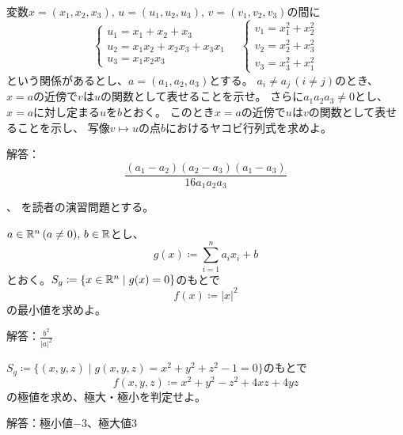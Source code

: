 \documentclass[report]{jlreq}
\begin{document}
\begin{problem}
    変数$x = (x_1, x_2, x_3),\, u = (u_1, u_2, u_3),\, v = (v_1, v_2, v_3)$の間に
    \begin{equation}
        \begin{cases}
            u_1 = x_1 + x_2 + x_3 \\
            u_2 = x_1 x_2 + x_2 x_3 + x_3 x_1 \\
            u_3 = x_1 x_2 x_3
        \end{cases}
        \quad
        \begin{cases}
            v_1 = x_1^2 + x_2^2 \\
            v_2 = x_2^2 + x_3^2 \\
            v_3 = x_3^2 + x_1^2
        \end{cases}
    \end{equation}
    という関係があるとし、$a = (a_1, a_2, a_3)$とする。
    $a_i \neq a_j\, (i \neq j)$のとき、
    $x = a$の近傍で$v$は$u$の関数として表せることを示せ。
    さらに$a_1 a_2 a_3 \neq 0$とし、
    $x = a$に対し定まる$u$を$b$とおく。
    このとき$x = a$の近傍で$u$は$v$の関数として表せることを示し、
    写像$v \mapsto u$の点$b$におけるヤコビ行列式を求めよ。

    解答：
    \begin{equation}
        \frac{(a_1 - a_2)(a_2 - a_3)(a_1 - a_3)}{16 a_1 a_2 a_3}
    \end{equation}
\end{problem}

\begin{problem}
    \cite[第II章 例題6.2]{杉浦+89}、
    \cite[第II章 問6.3]{杉浦+89}
    を読者の演習問題とする。
\end{problem}


\begin{problem}
    $a \in \mathbb{R}^n\, (a \neq0),\, b \in \mathbb{R}$とし、
    \begin{equation}
        g(x) \coloneqq \sum_{i = 1}^n a_i x_i + b
    \end{equation}
    とおく。$S_g \coloneqq \{ x \in \mathbb{R}^n \mid g(x) = 0 \}$のもとで
    \begin{equation}
        f(x) \coloneqq |x|^2
    \end{equation}
    の最小値を求めよ。

    解答：$\frac{b^2}{|a|^2}$
\end{problem}


\begin{problem}
    $S_g \coloneqq \{(x, y, z) \mid g(x, y, z) = x^2 + y^2 + z^2 - 1 = 0\}$のもとで
    \begin{equation}
        f(x, y, z) \coloneqq x^2 + y^2 - z^2 + 4xz + 4yz
    \end{equation}
    の極値を求め、極大・極小を判定せよ。

    解答：極小値$-3$、極大値$3$
\end{problem}
\end{document}
